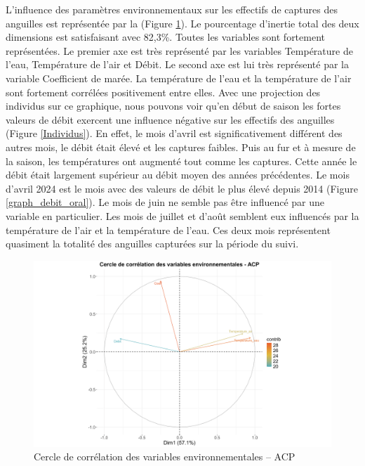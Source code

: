 \documentclass[11pt,titlepage,twoside]{article}\usepackage[]{graphicx}\usepackage[table]{xcolor}
\begin{document}
L’influence des paramètres environnementaux sur les effectifs de captures des anguilles est représentée par la (Figure \ref{ACP}). Le pourcentage d’inertie total des deux dimensions est satisfaisant avec 82,3\%. Toutes les variables sont fortement représentées. Le premier axe est très représenté par les variables Température de l’eau, Température de l’air et Débit. Le second axe est lui très représenté par la variable Coefficient de marée. La température de l’eau et la température de l’air sont fortement corrélées positivement entre elles. Avec une projection des individus sur ce graphique, nous pouvons voir qu’en début de saison les fortes valeurs de débit exercent une influence négative sur les effectifs des anguilles (Figure \ref{Individus}). En effet, le mois d’avril est significativement différent des autres mois, le débit était élevé et les captures faibles. Puis au fur et à mesure de la saison, les températures ont augmenté tout comme les captures. Cette année le débit était largement supérieur au débit moyen des années précédentes. Le mois d’avril 2024 est le mois avec des valeurs de débit le plus élevé depuis 2014 (Figure \ref{graph_debit_oral}). Le mois de juin ne semble pas être influencé par une variable en particulier. Les mois de juillet et d’août semblent eux influencés par la température de l’air et la température de l’eau. Ces deux mois représentent quasiment la totalité des anguilles capturées sur la période du suivi.

\begin{figure}[htpb]
\centering
\includegraphics[width=\textwidth]{ACP.png}
\caption{Cercle de corrélation des variables environnementales – ACP}
\label{ACP}
\end{figure} 
\end{document}
